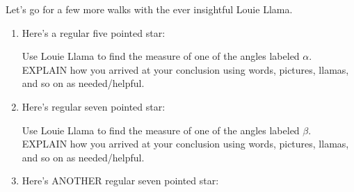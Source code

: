 \documentclass[nooutcomes,noauthor,hints]{ximera}
\begin{document}
\mynewpage

\begin{question}
  Let's go for a few more walks with the ever insightful Louie Llama.
  \begin{enumerate}
  \item Here's a regular five pointed star:
    \begin{center}
    \end{center}
    Use Louie Llama to find the measure of one of the angles labeled
    $\alpha$. EXPLAIN how you arrived at your conclusion using words,
    pictures, llamas, and so on as needed/helpful.
  \item Here's regular seven pointed star:
    \begin{center}
    \end{center}
    Use Louie Llama to find the measure of one of the angles labeled
    $\beta$. EXPLAIN how you arrived at your conclusion using words,
    pictures, llamas, and so on as needed/helpful.  
  \item Here's ANOTHER regular seven pointed star:
    \begin{center}
\end{center}
\end{enumerate}
\end{question}
\end{document}
